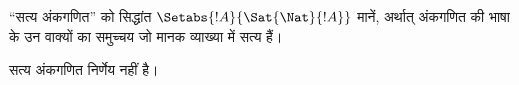 \documentclass[../../../include/open-logic-section]{subfiles}
\begin{document}
``सत्य अंकगणित'' को सिद्धांत $\Setabs{!A}{ \Sat{\Nat}{!A}}$ मानें,
अर्थात् अंकगणित की भाषा के उन वाक्यों का समुच्चय जो मानक व्याख्या में सत्य
हैं।

\begin{cor}
सत्य अंकगणित निर्णेय नहीं है।
\end{cor}

\end{document}

